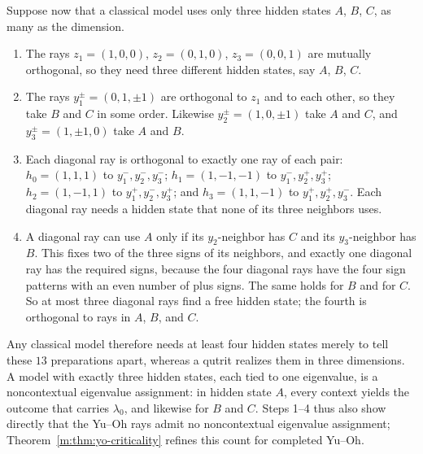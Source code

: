 \documentclass[aps,pra,reprint,superscriptaddress,longbibliography,nofootinbib,floatfix,10pt]{revtex4-2}
\theoremstyle{definition}\newtheorem{definition}[theorem]{Definition}
\theoremstyle{remark}\newtheorem{remark}[theorem]{Remark}
\begin{document}
Suppose now that a classical model uses only three hidden states $A$, $B$, $C$, as many as the dimension.
\begin{enumerate}
\item The rays $z_1=(1,0,0)$, $z_2=(0,1,0)$, $z_3=(0,0,1)$ are mutually orthogonal, so they need three different hidden states, say $A$, $B$, $C$.
\item The rays $y_1^\pm=(0,1,\pm1)$ are orthogonal to $z_1$ and to each other, so they take $B$ and $C$ in some order. Likewise $y_2^\pm=(1,0,\pm1)$ take $A$ and $C$, and $y_3^\pm=(1,\pm1,0)$ take $A$ and $B$.
\item Each diagonal ray is orthogonal to exactly one ray of each pair: $h_0=(1,1,1)$ to $y_1^-,y_2^-,y_3^-$; $h_1=(1,-1,-1)$ to $y_1^-,y_2^+,y_3^+$; $h_2=(1,-1,1)$ to $y_1^+,y_2^-,y_3^+$; and $h_3=(1,1,-1)$ to $y_1^+,y_2^+,y_3^-$. Each diagonal ray needs a hidden state that none of its three neighbors uses.
\item A diagonal ray can use $A$ only if its $y_2$-neighbor has $C$ and its $y_3$-neighbor has $B$. This fixes two of the three signs of its neighbors, and exactly one diagonal ray has the required signs, because the four diagonal rays have the four sign patterns with an even number of plus signs. The same holds for $B$ and for $C$. So at most three diagonal rays find a free hidden state; the fourth is orthogonal to rays in $A$, $B$, and $C$.
\end{enumerate}
Any classical model therefore needs at least four hidden states merely to tell these $13$ preparations apart, whereas a qutrit realizes them in three dimensions. A model with exactly three hidden states, each tied to one eigenvalue, is a noncontextual eigenvalue assignment: in hidden state $A$, every context yields the outcome that carries $\lambda_0$, and likewise for $B$ and $C$. Steps 1--4 thus also show directly that the Yu--Oh rays admit no noncontextual eigenvalue assignment; Theorem~\ref{m:thm:yo-criticality} refines this count for completed Yu--Oh.
\end{document}

